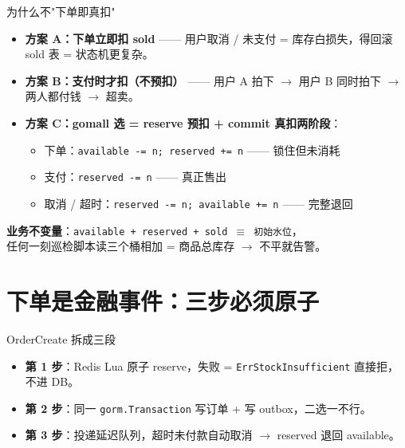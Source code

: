 \documentclass[aspectratio=169,11pt]{beamer}
\begin{document}
\begin{frame}[shrink]{为什么不"下单即真扣"}
\begin{itemize}
  \item \textbf{方案 A：下单立即扣 sold} —— 用户取消 / 未支付 = 库存白损失，得回滚 sold 表 = 状态机更复杂。
  \item \textbf{方案 B：支付时才扣（不预扣）} —— 用户 A 拍下 $\to$ 用户 B 同时拍下 $\to$ 两人都付钱 $\to$ 超卖。
  \item \textbf{方案 C：gomall 选 = reserve 预扣 + commit 真扣两阶段}：
    \begin{itemize}
      \item 下单：\texttt{available -= n; reserved += n} —— 锁住但未消耗
      \item 支付：\texttt{reserved -= n} —— 真正售出
      \item 取消 / 超时：\texttt{reserved -= n; available += n} —— 完整退回
    \end{itemize}
\end{itemize}
\vspace{2mm}
\small \textbf{业务不变量}：\texttt{available + reserved + sold $\equiv$ 初始水位}，\\
任何一刻巡检脚本读三个桶相加 = 商品总库存 $\to$ 不平就告警。
\end{frame}

\section{下单是金融事件：三步必须原子}

\begin{frame}[shrink]{OrderCreate 拆成三段}
\vspace{2mm}
\begin{itemize}
  \item \textbf{第 1 步}：Redis Lua 原子 reserve，失败 = \texttt{ErrStockInsufficient} 直接拒，不进 DB。
  \item \textbf{第 2 步}：同一 \texttt{gorm.Transaction} 写订单 + 写 outbox，二选一不行。
  \item \textbf{第 3 步}：投递延迟队列，超时未付款自动取消 $\to$ reserved 退回 available。
\end{itemize}
\end{frame}
\end{document}
